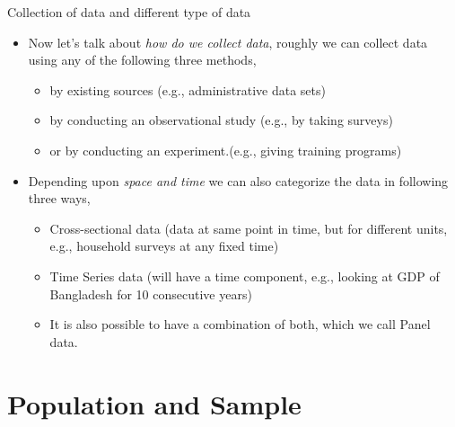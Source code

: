 \documentclass[8pt, usepdftitle=false]{beamer}
\begin{document}
\begin{frame}[allowframebreaks]{Collection of data and different type of data}
  
\begin{itemize}

\item Now let's talk about \emph{how do we collect data}, roughly we can collect data using any of the following three methods,

\begin{itemize}

  \item by existing sources (e.g., administrative data sets)
  \item by conducting an observational study (e.g., by taking surveys)
  \item or by conducting an experiment.(e.g., giving training programs)


\end{itemize}


\item Depending upon \emph{space and time} we can also categorize the data in following three ways, 



  \begin{itemize}
  \item Cross-sectional data (data at same point in time, but for different units, e.g., household surveys at any fixed time)
  \item Time Series data (will have a time component, e.g., looking at GDP of Bangladesh for 10 consecutive years)
  \item It is also possible to have a combination of both, which we call Panel data.
  \end{itemize}


\end{itemize}
\end{frame}











  






\section{Population and Sample}
\frame{\sectionpage}
\end{document}
